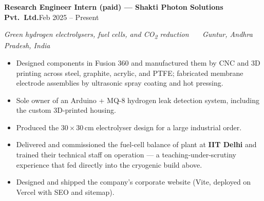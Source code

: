 \documentclass[a4paper,10pt]{article}
\newcommand{\entry}[2]{\textbf{#1}\hfill{\small #2}\par}
\newcommand{\sub}[1]{{\small\itshape #1}\par\vspace{1pt}}
\begin{document}
\entry{Research Engineer Intern (paid) --- Shakti Photon Solutions Pvt.\ Ltd.}{Feb 2025 -- Present}
\sub{Green hydrogen electrolysers, fuel cells, and CO\textsubscript{2} reduction \ \textbar\ \ Guntur, Andhra Pradesh, India}
\begin{itemize}
    \item Designed components in Fusion 360 and manufactured them by CNC and 3D printing across steel, graphite,
          acrylic, and PTFE; fabricated membrane electrode assemblies by ultrasonic spray coating and hot pressing.
    \item Sole owner of an Arduino + MQ-8 hydrogen leak detection system, including the custom 3D-printed housing.
    \item Produced the $30\times30$\,cm electrolyser design for a large industrial order.
    \item Delivered and commissioned the fuel-cell balance of plant at \textbf{IIT Delhi} and trained their
          technical staff on operation --- a teaching-under-scrutiny experience that fed directly into the
          cryogenic build above.
    \item Designed and shipped the company's corporate website (Vite, deployed on Vercel with SEO and sitemap).
\end{itemize}

\end{document}
